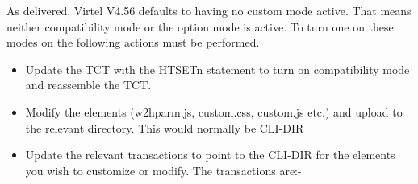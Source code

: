 \documentclass[letterpaper,10pt,english]{sphinxmanual}
\begin{document}
\begin{sphinxVerbatim}[commandchars=\\\{\}]
    
\end{sphinxVerbatim}

As delivered, Virtel V4.56 defaults to having no custom mode active. That means neither compatibility mode or the option mode is active. To turn one on these modes on the following actions must be performed.

\begin{itemize}
\item {} 
Update the TCT with the HTSETn statement to turn on compatibility mode and reassemble the TCT.

\item {} 
Modify the elements (w2hparm.js, custom.css, custom.js etc.) and upload to the relevant directory. This would normally be CLI-DIR

\item {} 
Update the relevant transactions to point to the CLI-DIR for the elements you wish to customize or modify. The transactions are:-

\end{itemize}

\begin{sphinxVerbatim}[commandchars=\\\{\}]
              
                              
               
                           
\end{sphinxVerbatim}
\end{document}
